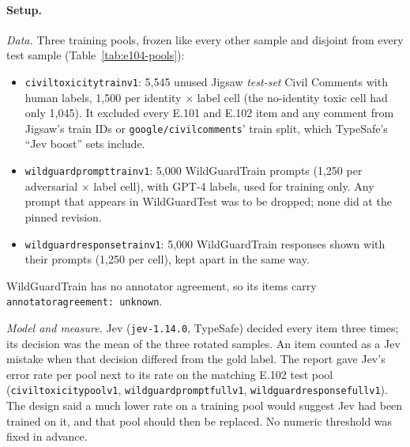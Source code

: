 \documentclass[11pt]{article}
\renewcommand{\_}{\origunderscore\allowbreak}
\begin{document}
\paragraph{Setup.}
\emph{Data.} Three training pools, frozen like every other sample and disjoint from every test sample (Table~\ref{tab:e104-pools}):
\begin{itemize}[nosep]
  \item \texttt{civil\_toxicity\_train\_v1}: 5,545 unused Jigsaw \emph{test-set} Civil Comments with human labels, 1,500 per identity $\times$ label cell (the no-identity toxic cell had only 1,045). It excluded every E.101 and E.102 item and any comment from Jigsaw's train IDs or \texttt{google/civil\_comments}' train split, which TypeSafe's ``Jev boost'' sets include.
  \item \texttt{wildguard\_prompt\_train\_v1}: 5,000 WildGuardTrain prompts (1,250 per adversarial $\times$ label cell), with GPT-4 labels, used for training only. Any prompt that appears in WildGuardTest was to be dropped; none did at the pinned revision.
  \item \texttt{wildguard\_response\_train\_v1}: 5,000 WildGuardTrain responses shown with their prompts (1,250 per cell), kept apart in the same way.
\end{itemize}
WildGuardTrain has no annotator agreement, so its items carry \texttt{annotator\_agreement: unknown}.

\emph{Model and measure.} Jev (\texttt{jev-1.14.0}, TypeSafe) decided every item three times; its decision was the mean of the three rotated samples. An item counted as a Jev mistake when that decision differed from the gold label. The report gave Jev's error rate per pool next to its rate on the matching E.102 test pool (\texttt{civil\_toxicity\_pool\_v1}, \texttt{wildguard\_prompt\_full\_v1}, \texttt{wildguard\_response\_full\_v1}). The design said a much lower rate on a training pool would suggest Jev had been trained on it, and that pool should then be replaced. No numeric threshold was fixed in advance.
\end{document}
